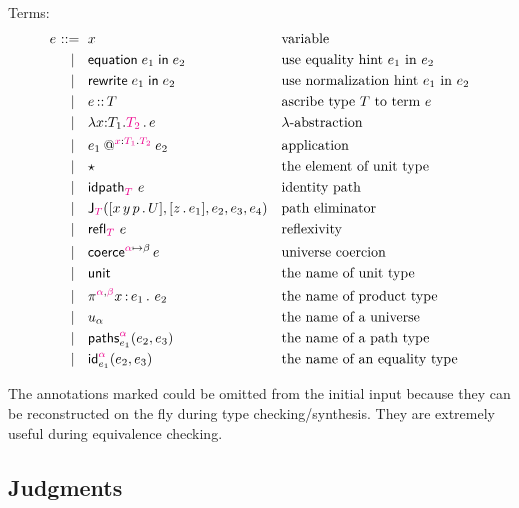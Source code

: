 \documentclass{article}
\makeatletter
\newcommand{\T}{T} %
\newcommand{\U}{U} %
\newcommand{\x}{x} %
\newcommand{\e}{e} %
\newcommand{\bnf}{\ \mathrel{{:}{:}{=}}\ }
\newcommand{\bnfor}{\ \mid\ \ }
\newcommand{\lam}[3]{\lambda #1 {:} #2.{#3}\,.\,} %
\newcommand{\app}[5]{#1\mathbin{@^{#2{:}#3.#4}} #5} %
\newcommand{\abst}[2]{[#1 \,.\, #2]} %
\newcommand{\ascribe}[2]{#1 \,{:}{:}\, #2} %
\newcommand{\unitTerm}{\star} %
\newcommand{\coerce}[3]{\mathsf{coerce}^{#1{\mapsto}#2} \, #3}
\newcommand{\PrElim}[6]{\mathsf{J}_{#1}(#2, #3, #4, #5, #6)} %
\newcommand{\prRefl}[1]{{\mathsf{idpath}_{#1}}\ }  %
\newcommand{\juRefl}[1]{{\mathsf{refl}_{#1}}\ }    %
\newcommand{\nUnit}{\mathsf{unit}} %
\newcommand{\nProd}[4]{\pi^{#1,#2} #3\,{:}\,#4 \,.\ } %
\newcommand{\nUniverse}[1]{u_{#1}}  %
\newcommand{\nPrEqual}[4]{\mathsf{paths}^{#1}_{#2}(#3,#4)} %
\newcommand{\nJuEqual}[4]{\mathsf{id}^{#1}_{#2}(#3,#4)} %
\newcommand{\equationin}[1]{\mathsf{equation}\; #1 \; \mathsf{in} \;} %
\newcommand{\rewritein}[1]{\mathsf{rewrite}\; #1 \; \mathsf{in} \;} %
\newcommand{\inferred}[1]{{\color{magenta}{#1}}}
\makeatother
\begin{document}
Terms:
%
\begin{equation*}
  \e
  \begin{aligned}[t]
    \bnf   {}&  \x   &&\text{variable} \\
    \bnfor {}&  \equationin{\e_1} e_2 &&\text{use equality hint $\e_1$ in $\e_2$} \\
    \bnfor {}&  \rewritein{\e_1} e_2 &&\text{use normalization hint $\e_1$ in $\e_2$} \\
    \bnfor {}&  \ascribe{\e}{\T}  &&\text{ascribe type $\T$ to term $\e$} \\
    \bnfor {}&  \lam{\x}{\T_1}{\inferred{\T_2}} \e  &&\text{$\lambda$-abstraction} \\
    \bnfor {}&  \app{\e_1}{\inferred\x}{\inferred{\T_1}}{\inferred{\T_2}}{\e_2}  &&\text{application} \\
    \bnfor {}&  \unitTerm  &&\text{the element of unit type} \\
    \bnfor {}&  \prRefl{\inferred\T}{\e}  &&\text{identity path} \\
    \bnfor {}&  \PrElim{\inferred\T}{\abst{x\,y\,p}{\U}}{\abst{z}{\e_1}}{\e_2}{\e_3}{\e_4}  &&\text{path eliminator} \\
    \bnfor {}&  \juRefl{\inferred\T} \e  &&\text{reflexivity} \\
    \bnfor {}&  \coerce{\inferred\alpha}{\beta}{\e}  &&\text{universe coercion} \\
    \bnfor {}&  \nUnit  &&\text{the name of unit type} \\
    \bnfor {}&  \nProd{\inferred\alpha}{\inferred\beta}{\x}{\e_1} \e_2  &&\text{the name of product type} \\
    \bnfor {}&  \nUniverse{\alpha} &&\text{the name of a universe} \\
    \bnfor {}&  \nPrEqual{\inferred\alpha}{\e_1}{\e_2}{\e_3}  &&\text{the name of a path type} \\
    \bnfor {}&  \nJuEqual{\inferred\alpha}{\e_1}{\e_2}{\e_3}  &&\text{the name of an equality type}
  \end{aligned}
\end{equation*}

The annotations marked {\inferred{like this}} could be omitted from the initial input because they
can be reconstructed on the fly during type checking/synthesis. They are extremely useful during
equivalence checking.

\subsection{Judgments}
\label{sec:bidirectional-judgments}
\end{document}
